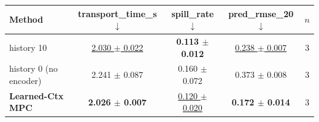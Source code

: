 \begin{tabular}{lcccc}
\toprule
Method & transport\_time\_s $\downarrow$ & spill\_rate $\downarrow$ & pred\_rmse\_20 $\downarrow$ & $n$ \\
\midrule
history 10 & \underline{2.030 $\pm$ 0.022} & \textbf{0.113 $\pm$ 0.012} & \underline{0.238 $\pm$ 0.007} & 3 \\
history 0 (no encoder) & 2.241 $\pm$ 0.087 & 0.160 $\pm$ 0.072 & 0.373 $\pm$ 0.008 & 3 \\
\textbf{Learned-Ctx MPC} & \textbf{2.026 $\pm$ 0.007} & \underline{0.120 $\pm$ 0.020} & \textbf{0.172 $\pm$ 0.014} & 3 \\
\bottomrule
\end{tabular}
